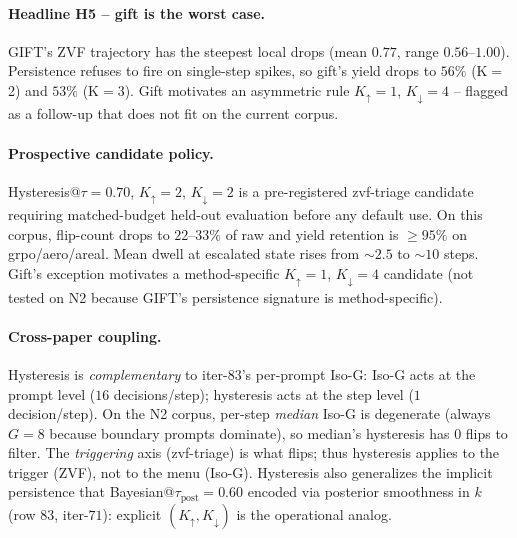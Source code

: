 \paragraph{Headline H5 -- gift is the worst case.}
GIFT's ZVF trajectory has the steepest local drops (mean $0.77$,
range $0.56$--$1.00$).  Persistence refuses to fire on
single-step spikes, so gift's yield drops to $56\%$ (K$=$2)
and $53\%$ (K$=$3).  Gift motivates an asymmetric rule
$K_{\uparrow}{=}1$, $K_{\downarrow}{=}4$ -- flagged as a
follow-up that does not fit on the current corpus.

\paragraph{Prospective candidate policy.}
Hysteresis@$\tau = 0.70$, $K_{\uparrow} = 2$, $K_{\downarrow} = 2$ is a
pre-registered zvf-triage candidate requiring matched-budget held-out
evaluation before any default use. On this corpus, flip-count drops to
$22$--$33\%$ of raw and yield retention is $\ge 95\%$ on grpo/aero/areal.
Mean dwell at escalated state rises from $\sim 2.5$ to $\sim 10$ steps. Gift's
exception motivates a method-specific $K_{\uparrow} = 1$,
$K_{\downarrow} = 4$ candidate (not tested on N2 because GIFT's persistence
signature is method-specific).

\paragraph{Cross-paper coupling.}
Hysteresis is \emph{complementary} to iter-83's per-prompt
Iso-G: Iso-G acts at the prompt level ($16$ decisions/step);
hysteresis acts at the step level ($1$ decision/step).
On the N2 corpus, per-step \emph{median} Iso-G is degenerate
(always $G = 8$ because boundary prompts dominate), so
median's hysteresis has $0$ flips to filter.  The
\emph{triggering} axis (zvf-triage) is what flips; thus
hysteresis applies to the trigger (ZVF), not to the menu (Iso-G).
Hysteresis also generalizes the implicit persistence that
Bayesian@$\tau_{\mathrm{post}}{=}0.60$ encoded via posterior
smoothness in $k$ (row $83$, iter-$71$): explicit
$(K_{\uparrow}, K_{\downarrow})$ is the operational analog.

